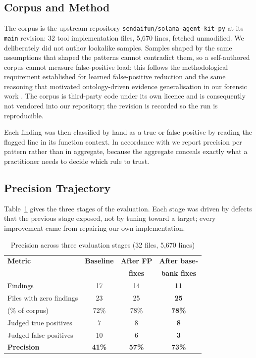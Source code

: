 \subsection{Corpus and Method}

The corpus is the upstream repository \texttt{sendaifun/\allowbreak solana-agent-kit-py} at
its \texttt{main} revision: 32 tool implementation files, 5{,}670 lines,
fetched unmodified. We deliberately did not author lookalike samples. Samples
shaped by the same assumptions that shaped the patterns cannot contradict them,
so a self-authored corpus cannot measure false-positive load; this follows the
methodological requirement established for learned false-positive reduction
\cite{yang2024falsepositives} and the same reasoning that motivated
ontology-driven evidence generalisation in our forensic work
\cite{firmansyah2024forensic}. The corpus is third-party code under its own
licence and is consequently not vendored into our repository; the revision is
recorded so the run is reproducible.

Each finding was then classified by hand as a true or false positive by
reading the flagged line in its function context. In accordance with
\cite{yang2024falsepositives} we report precision per pattern rather than in
aggregate, because the aggregate conceals exactly what a practitioner needs to
decide which rule to trust.

\subsection{Precision Trajectory}

Table~\ref{tab:traj} gives the three stages of the evaluation. Each stage was
driven by defects that the previous stage exposed, not by tuning toward a
target; every improvement came from repairing our own implementation.

\begin{table}[t]
\caption{Precision across three evaluation stages (32 files, 5{,}670 lines)}
\label{tab:traj}
\centering
\begin{tabular}{@{}lccc@{}}
\toprule
\textbf{Metric} & \textbf{Baseline} & \textbf{After FP} & \textbf{After base-} \\
                &                  & \textbf{fixes}    & \textbf{bank fixes} \\
\midrule
Findings                & 17 & 14 & \textbf{11} \\
Files with zero findings & 23 & 25 & \textbf{25} \\
\quad(\% of corpus)      & 72\% & 78\% & \textbf{78\%} \\
Judged true positives   & 7  & 8  & \textbf{8} \\
Judged false positives  & 10 & 6  & \textbf{3} \\
\textbf{Precision}      & \textbf{41\%} & \textbf{57\%} & \textbf{73\%} \\
\bottomrule
\end{tabular}
\end{table}

